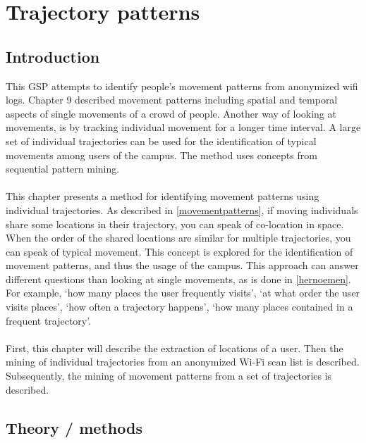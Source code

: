 \chapter{Trajectory patterns}
\section{Introduction}
This GSP attempts to identify people’s movement patterns from anonymized wifi logs. Chapter 9 described movement patterns including spatial and temporal aspects of single movements of a crowd of people. Another way of looking at movements, is by tracking individual movement for a longer time interval. A large set of individual trajectories can be used for the identification of typical movements among users of the campus. The method uses concepts from sequential pattern mining. \\\\
This chapter presents a method for identifying movement patterns using individual trajectories. As described in \autoref{movementpatterns}, if moving individuals share some locations in their trajectory, you can speak of co-location in space. When the order of the shared locations are similar for multiple trajectories, you can speak of typical movement. This concept is explored for the identification of movement patterns, and thus the usage of the campus. This approach can answer different questions than looking at single movements, as is done in \autoref{hernoemen}. For example, ‘how many places the user frequently visits’, ‘at what order the user visits places’, ‘how often a trajectory happens’, ‘how many places contained in a frequent trajectory’.\\\\
First, this chapter will describe the extraction of locations of a user. Then the mining of individual trajectories from an anonymized Wi-Fi scan list is described. Subsequently, the mining of movement patterns from a set of trajectories is described.
\section{Theory / methods}
